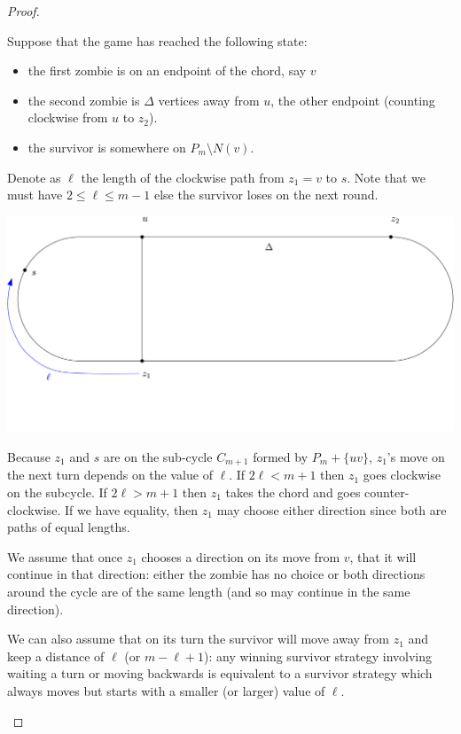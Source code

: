 \begin{proof}
\begin{proofpart}
  Suppose that the game has reached the following state:
  \begin{itemize}
   \item the first zombie is on an endpoint of the chord, say $v$
   \item the second zombie is $\Delta$ vertices away from $u$, the other endpoint (counting clockwise from $u$ to $z_2$).
   \item the survivor is somewhere on $P_m \setminus N(v)$.
  \end{itemize}
  Denote as $\ell$ the length of the clockwise
  path from $z_1 = v$ to $s$. Note that we must have $2 \leq \ell \leq m-1$ else the survivor loses on the next round.
  \begin{center}
   \includegraphics[scale=0.20]{q_m_n/diagram1}
  \end{center}

  Because $z_1$ and $s$ are on the sub-cycle $C_{m+1}$ formed by
  $P_m + \{uv\}$, $z_1$'s move on the next turn depends on the
  value of $\ell$. If $2\ell < m+1$ then $z_1$ goes clockwise
  on the subcycle. If $2\ell > m+1$ then $z_1$ takes the chord and
  goes counter-clockwise.  If we have equality, then $z_1$ may
  choose either direction since both are paths of equal lengths.

  We assume that once $z_1$ chooses a direction on its move from $v$,
  that it will continue in that direction:
  either the zombie has no choice or both directions around
  the cycle are of the same length (and so
  may continue in the same direction).

  We can also assume that on its turn the survivor will move away from
  $z_1$ and keep a distance of $\ell$ (or $m-\ell +1$):
  any winning survivor strategy involving waiting a turn
  or moving backwards is equivalent to a survivor strategy which always moves but starts with a smaller (or larger) value of $\ell$.


\end{proofpart}
\end{proof}
